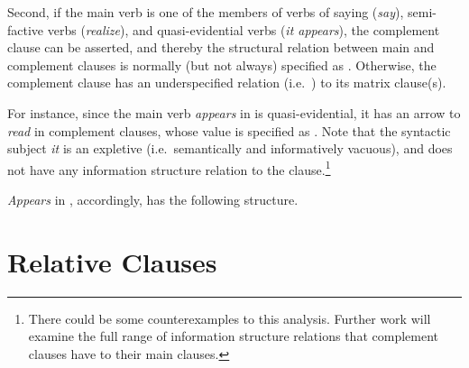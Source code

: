 Second, if the main verb is one of the members of verbs of saying
(\textit{say}), semi-factive verbs (\textit{realize}), and
quasi-evidential verbs (\textit{it appears}), the complement clause
can be asserted, and thereby the structural
relation between main and complement clauses is normally (but not
always) specified as .  Otherwise, the complement clause
has an underspecified relation (i.e.\ ) to its matrix
clause(s).



For instance, since the main verb \textit{appears} in
 is quasi-evidential, it has an arrow to
\textit{read} in complement clauses, whose value is specified as
. Note that the syntactic subject \textit{it} is an
expletive (i.e.\ semantically and informatively vacuous), and does not
have any information structure relation to the clause.\footnote{There
  could be some counterexamples to this analysis. Further work will
  examine the full range of information structure relations that
  complement clauses have to their main clauses.}


\noindent \textit{Appears} in , accordingly, has
the following structure.



\section{Relative Clauses}
\label{10:ssec:relative}

